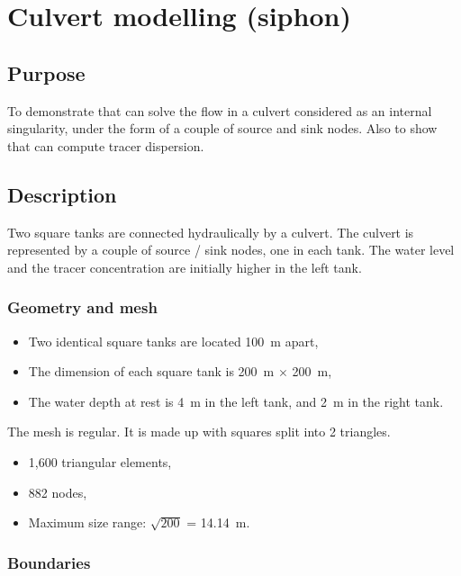 \chapter{Culvert modelling (siphon)}
\section{Purpose}

To demonstrate that  can solve the flow in a culvert considered as
an internal singularity, under the form of a couple of source and sink nodes.
Also to show that  can compute tracer dispersion.

\section{Description}

Two square tanks are connected hydraulically by a culvert. The culvert is
represented by a couple of source / sink nodes, one in each tank. The water
level and the tracer concentration are initially higher in the left tank.

\subsection{Geometry and mesh}

\begin{itemize}
\item  Two identical square tanks are located 100~m apart,
\item  The dimension of each square tank is 200~m $\times$ 200~m,
\item  The water depth at rest is 4~m in the left tank, and 2~m in the right tank.
\end{itemize}

The mesh is regular. It is made up with squares split into 2 triangles.

\begin{itemize}
\item 1,600 triangular elements,
\item 882 nodes,
\item Maximum size range: $\sqrt{200}$ = 14.14~m.
\end{itemize}

\subsection{Boundaries}


